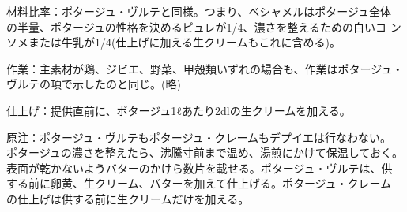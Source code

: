材料比率：ポタージュ・ヴルテと同様。つまり、ベシャメルはポタージュ全体
の半量、ポタージュの性格を決めるピュレが1/4、濃さを整えるための白いコ
ンソメまたは牛乳が1/4(仕上げに加える生クリームもこれに含める)。

作業：主素材が鶏、ジビエ、野菜、甲殻類いずれの場合も、作業はポタージュ・
ヴルテの項で示したのと同じ。(略)

仕上げ：提供直前に、ポタージュ1ℓあたり2dlの生クリームを加える。

原注：ポタージュ・ヴルテもポタージュ・クレームもデプイエは行なわない。
ポタージュの濃さを整えたら、沸騰寸前まで温め、湯煎にかけて保温しておく。
表面が乾かないようバターのかけら数片を載せる。ポタージュ・ヴルテは、供
する前に卵黄、生クリーム、バターを加えて仕上げる。ポタージュ・クレーム
の仕上げは供する前に生クリームだけを加える。

